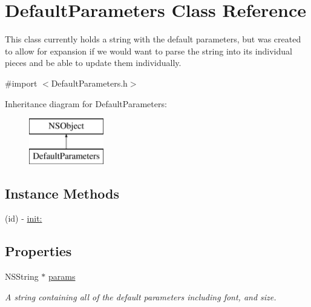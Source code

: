 \hypertarget{interface_default_parameters}{\section{Default\-Parameters Class Reference}
\label{interface_default_parameters}
}


This class currently holds a string with the default parameters, but was created to allow for expansion if we would want to parse the string into its individual pieces and be able to update them individually.  




{\ttfamily \#import $<$Default\-Parameters.\-h$>$}

Inheritance diagram for Default\-Parameters\-:\begin{figure}[H]
\begin{center}
\leavevmode
\includegraphics[height=2.000000cm]{interface_default_parameters}
\end{center}
\end{figure}
\subsection*{Instance Methods}
\begin{DoxyCompactItemize}
\item 
(id) -\/ \hyperlink{interface_default_parameters_a56118e230ce34a2601faf5c95a358cb6}{init\-:}
\end{DoxyCompactItemize}
\subsection*{Properties}
\begin{DoxyCompactItemize}
\item 
\hypertarget{interface_default_parameters_aebb372b87de453d373aac55ecddc6303}{N\-S\-String $\ast$ \hyperlink{interface_default_parameters_aebb372b87de453d373aac55ecddc6303}{params}}\label{interface_default_parameters_aebb372b87de453d373aac55ecddc6303}

\begin{DoxyCompactList}\small\item\em A string containing all of the default parameters including font, and size. \end{DoxyCompactList}\end{DoxyCompactItemize}


